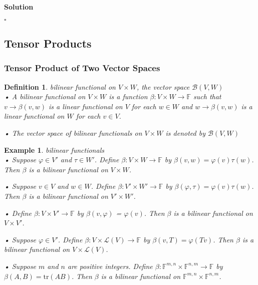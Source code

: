 \documentclass{article}
\newtheorem{example}{Example}[subsection]
\newtheorem{definition}{Definition}[subsection]
\newenvironment{solution}{%
{
    \textbf{Solution\\}
    }
}{
  \hfill $\square$ 
  \par\bigskip 
}
\newcommand{\FF}{\mathbb{F}}
\newcommand{\tr}{\text{tr}}
\begin{document}
\begin{CJK}{UTF8}{gkai}
\begin{solution}
    
\end{solution}

\subsection{Tensor Products}

\subsubsection{Tensor Product of Two Vector Spaces}

\begin{definition}
    bilinear functional on $V \times W$, the vector space $\mathcal{B}(V,W)$\\

    • A bilinear functional on $V\times W$ is a function $\beta: V\times W \to \FF$ such that $v \to\beta(v,w)$ is a linear functional on $V$ for each $w \in W$ and $w \to \beta(v,w)$ is a linear functional on $W$ for each $v \in V$.

    • The vector space of bilinear functionals on $V\times W$ is denoted by $\mathcal{B}(V,W)$
\end{definition}

\begin{example}
    bilinear functionals\\

    • Suppose $\varphi \in V'$ and $\tau \in W'$. Define $\beta: V\times W \to \FF$ by $\beta(v,w) = \varphi(v)\tau(w)$. Then $\beta$ is a bilinear functional on $V\times W$.

    • Suppose $v \in V$ and $w \in W$. Define $\beta: V'\times W' \to \FF$ by $\beta(\varphi,\tau) = \varphi(v)\tau(w)$. Then $\beta$ is a bilinear functional on $V'\times W'$.

    • Define $\beta: V\times V' \to \FF$ by $\beta(v,\varphi)$ = $\varphi(v)$. Then $\beta$ is a bilinear functional on $V\times V'$.

    • Suppose $\varphi \in V'$. Define $\beta: V\times\mathcal{L}(V) \to \FF$ by $\beta(v,T) = \varphi(Tv)$. Then $\beta$ is a bilinear functional on $V \times \mathcal{L}(V)$.

    • Suppose $m$ and $n$ are positive integers. Define $\beta: \FF^{m,n}\times\FF^{n,m} \to \FF$ by $\beta(A,B) = \tr(AB)$. Then $\beta$ is a bilinear functional on $\FF^{m,n} \times \FF^{n,m}$.
\end{example}


\end{CJK}
\end{document}
